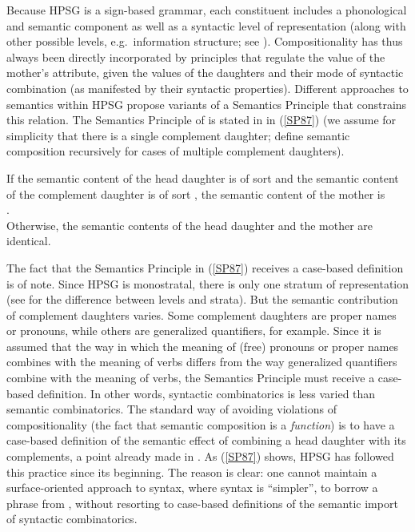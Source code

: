 \documentclass[output=paper,biblatex,babelshorthands,newtxmath,draftmode,colorlinks,citecolor=brown]{langscibook}
\begin{document}
Because HPSG is a sign-based grammar, each constituent includes a phonological and semantic
component as well as a syntactic level of representation (along with other possible levels, e.g.\
information structure; see ). Compositionality has thus
always been directly incorporated by principles that regulate the value of the mother's 
attribute, given the \attrib{sem} values of the daughters and their mode of syntactic combination
(as manifested by their syntactic properties). Different approaches to semantics within HPSG propose
variants of a Semantics Principle\is{principle!Semantics} that constrains this relation. The Semantics Principle of
\citet[109]{PollardandSag1987} is stated in \ili{English} in (\ref{SP87}) (we assume for simplicity
that there is a single complement daughter; \citeauthor{PollardandSag1987} define semantic
composition recursively for cases of multiple complement daughters).

\ealnoraggedright
\label{SP87}
\ex
If the semantic content  of the head daughter is of sort  and the semantic content  of the complement daughter is of sort , the semantic content of the mother is\\ .\\
\ex Otherwise, the semantic contents of the head daughter and the mother are identical.
\zl

\largerpage
The fact that the Semantics Principle in (\ref{SP87}) receives a case-based definition is of
note. Since HPSG is monostratal, there is only one stratum of representation (see
\citealt{Ladusaw1988b} for the difference between levels and strata). But the semantic contribution
of complement daughters varies. Some complement daughters are proper names or pronouns, while others
are generalized quantifiers, for example. Since it is assumed that the way in which the meaning of
(free) pronouns or proper names combines with the meaning of verbs differs from the way generalized
quantifiers combine with the meaning of verbs, the Semantics Principle must receive a case-based
definition. In other words, syntactic combinatorics is less varied than semantic combinatorics. The
standard way of avoiding violations of compositionality (the fact that semantic composition is a
\emph{function}) is to have a case-based definition of the semantic effect of combining a head
daughter with its complements, a point already made in \citet{Partee1984a}. As (\ref{SP87}) shows,
HPSG has followed this practice since its beginning. The reason is clear: one cannot maintain a
surface-oriented approach to syntax, where syntax is ``simpler'', to borrow a phrase from
\citet{CulicoverandJackendoff2005}, without resorting to case-based definitions of the semantic
import of syntactic combinatorics.
\end{document}

